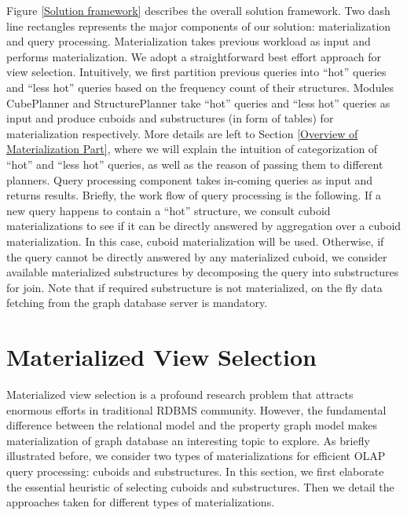 Figure \ref{Solution framework} describes the overall solution framework. Two dash line rectangles represents the major components of our solution: materialization and query processing. Materialization takes previous workload as input and performs materialization. We adopt a straightforward best effort approach for view selection. Intuitively, we first partition previous queries into ``hot'' queries and ``less hot'' queries based on the frequency count of their structures. Modules CubePlanner and StructurePlanner take ``hot'' queries and ``less hot'' queries as input and produce cuboids and substructures (in form of tables) for materialization respectively. More details are left to Section \ref{Overview of Materialization Part}, where we will explain the intuition of categorization of ``hot'' and ``less hot'' queries, as well as the reason of passing them to different planners.  Query processing component takes in-coming queries as input and returns results. Briefly, the work flow of query processing is the following. If a new query happens to contain a ``hot'' structure, we consult cuboid materializations to see if it can be directly answered by aggregation over a cuboid materialization. In this case, cuboid materialization will be used. Otherwise, if the query cannot be directly answered by any materialized cuboid, we consider available materialized substructures by decomposing the query into substructures for join. Note that if required substructure is not materialized, on the fly data fetching from the graph database server is mandatory. %





\section{Materialized View Selection}
\label{Materialization Part}

Materialized view selection is a profound research problem that attracts enormous efforts in traditional RDBMS community. However, the fundamental difference between the relational model and the property graph model makes materialization of graph database an interesting topic to explore. As briefly illustrated before, we consider two types of materializations for efficient OLAP query processing: cuboids and substructures. In this section, we first elaborate the essential heuristic of selecting cuboids and substructures. Then we detail the approaches taken for different types of materializations.

